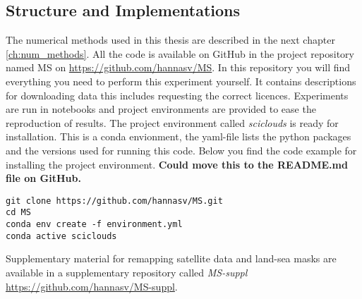 \subsection{Structure and Implementations}
The numerical methods used in this thesis are described in the next chapter \ref{ch:num_methods}. All the code is available on GitHub in the project repository named MS on \href{https://github.com/hannasv/MS}{https://github.com/hannasv/MS}. In this repository you will find everything you need to perform this experiment yourself. It contains descriptions for downloading data this includes requesting the correct licences. Experiments are run in notebooks and project environments are provided to ease the reproduction of results. The project environment called \textit{sciclouds} is ready for installation. This is a conda envionment, the yaml-file lists the python packages and the versions used for running this code. Below you find the code example for installing the project environment.
\textbf{Could move this to the README.md file on GitHub.}
\begin{verbatim}
git clone https://github.com/hannasv/MS.git
cd MS
conda env create -f environment.yml
conda active sciclouds
\end{verbatim}
Supplementary material for remapping satellite data and land-sea masks are available in a supplementary repository called \textit{MS-suppl} \href{https://github.com/hannasv/MS-suppl}{https://github.com/hannasv/MS-suppl}.